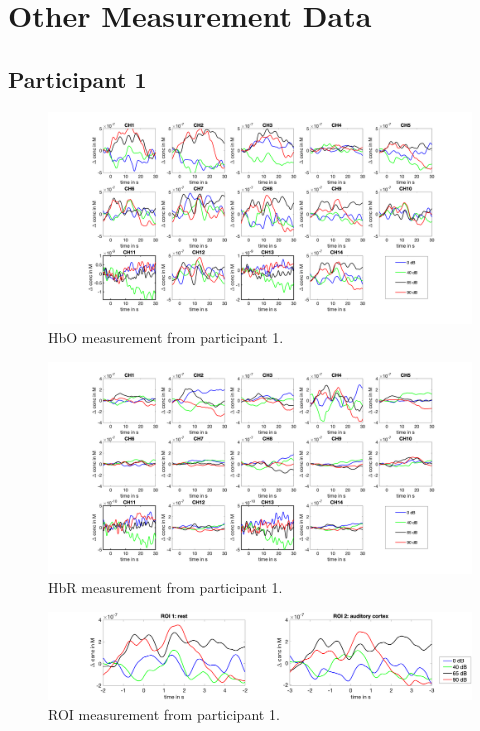\chapter{Other Measurement Data}

\section {Participant 1}
\begin{figure}[H]
  \centering
    \includegraphics[scale=.4]{bilder/HbO_Mole/sub_chang_s_HbO.png}
  \caption{HbO measurement from participant 1.}
  \label{fig:somesignal}
\end{figure}

\begin{figure}[H]
  \centering
    \includegraphics[scale=.4]{bilder/HbR_Mole/sub_chang_s_HbR.png}
  \caption{HbR measurement from participant 1.}
  \label{fig:somesignal}
\end{figure}

\begin{figure}[H]
  \centering
    \includegraphics[scale=.29]{bilder/ROI/sub_chang_s_HbO.png}
  \caption{ROI measurement from participant 1.}
\end{figure}
\newpage


